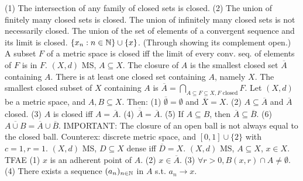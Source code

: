 (1) The intersection of any family of closed sets is closed.
(2) The union of finitely many closed sets is closed.
 The union of infinitely many closed sets
is not necessarily closed.
 The union of the set of elements of a convergent sequence
and its limit is closed. $\{x_n : n \in \mathbb{N}\} \cup \{x\}$.
(Through showing its complement open.)
 A subset $F$ of a metric space is closed iff
the limit of every conv. seq. of elements of $F$ is in $F$.
 $(X,d)$ MS, $A \subseteq X$.
The closure of $A$ is the smallest closed set $\overline{A}$ containing $A$.
There is at least one closed set containing $A$,
namely $X$.
The smallest closed subset of $X$ containing $A$ is
$\overline{A} = \bigcap_{A \subseteq F \subseteq X, F \text{ closed}} F$.
 Let $(X, d)$ be a metric space, and $A, B \subseteq X$. Then:
(1) $\overline{\emptyset} = \emptyset$ and $\overline{X} = X$.
(2) $A \subseteq \overline{A}$ and $\overline{A}$ closed.
(3) $A$ is closed iff $A = \overline{A}$.
(4) $\overline{\overline{A}} = \overline{A}$.
(5) If $A \subseteq B$, then $\overline{A} \subseteq \overline{B}$.
(6) $\overline{A \cup B} = \overline{A} \cup \overline{B}$.
IMPORTANT: The closure of an open ball is not always equal to the closed ball.
Counterex: discrete metric space, and $[0,1] \cup \{2\}$ with $c=1, r=1$.
 $(X,d)$ MS, $D \subseteq X$ dense iff $\overline{D} = X$.
 $(X,d)$ MS, $A \subseteq X$, $x \in X$. TFAE
(1) $x$ is an adherent point of $A$.
(2) $x \in \overline{A}$.
(3) $\forall r > 0, B(x, r) \cap A \neq \emptyset$.
(4) There exists a sequence $(a_n)_{n \in \mathbb{N}}$ in $A$ s.t. $a_n \to x$.
